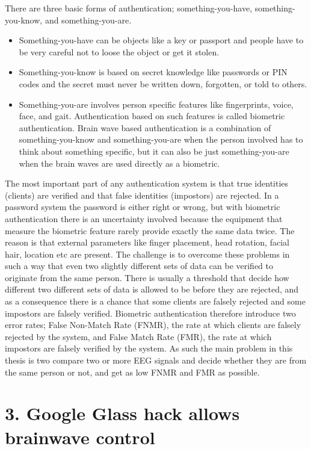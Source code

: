 \documentclass[a4paper,11pt]{article}
\begin{document}
There are three basic forms of authentication; something-you-have, something-you-know, and something-you-are.
\begin{itemize}
\item Something-you-have can be objects like a key or passport and people have to be very careful not to loose the object or get it stolen.
\item Something-you-know is based on secret knowledge like passwords or PIN codes and the secret must never be written down, forgotten, or told to others.
\item Something-you-are involves person specific features like fingerprints, voice, face, and gait. Authentication based on such features is called biometric authentication. Brain wave based authentication is a combination of something-you-know and something-you-are when the person involved has to think about something specific, but it can also be just something-you-are when the brain waves are used directly as a biometric.
\end{itemize}
 
The most important part of any authentication system is that true identities (clients) are verified and that false identities (impostors) are rejected. In a password system the password is either right or wrong, but with biometric authentication there is an uncertainty involved because the equipment that  measure the biometric feature rarely provide exactly the same data twice. The reason is that external parameters like finger placement, head rotation, facial hair, location etc are present. The challenge is to overcome these problems in such a way that even two slightly different sets of data can be verified to originate from the same person. There is usually a threshold that decide how different
two different sets of data is allowed to be before they are rejected, and as a consequence there is a chance that some clients are falsely rejected and some impostors are falsely verified.
Biometric authentication therefore introduce two error rates; False Non-Match Rate (FNMR), the rate at which clients are falsely rejected by the system, and False Match Rate (FMR), the rate at which impostors are falsely verified by the system. As such the main problem in this thesis is two compare two or more EEG signals and decide whether they are from the same person or not, and get as low FNMR and FMR as possible.

\chapter{3. Google Glass hack allows brainwave control}
\end{document}
